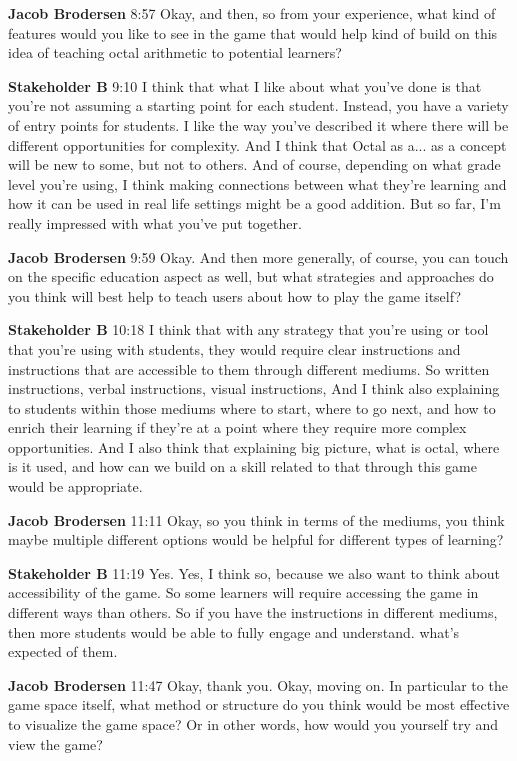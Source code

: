\documentclass{article}
\begin{document}
\noindent \textbf{Jacob Brodersen}   8:57
Okay, and then, so from your experience, what kind of features would you like to see in the game that would help kind of build on this idea of teaching octal arithmetic to potential learners?

\noindent \textbf{Stakeholder B}   9:10
I think that what I like about what you've done is that you're not assuming a starting point for each student. Instead, you have a variety of entry points for students. I like the way you've described it where there will be different opportunities for complexity.
And I think that Octal as a...
as a concept will be new to some, but not to others. And of course, depending on what grade level you're using, I think making connections between what they're learning and how it can be used in real life settings might be a good addition. But so far, I'm really impressed with what you've put together.

\noindent \textbf{Jacob Brodersen}   9:59
Okay. And then more generally, of course, you can touch on the specific education aspect as well, but what strategies and approaches do you think will best help to teach users about how to play the game itself?

\noindent \textbf{Stakeholder B}   10:18
I think that with any strategy that you're using or tool that you're using with students, they would require clear instructions and instructions that are accessible to them through different mediums. So written instructions, verbal instructions, visual instructions,
And I think also explaining to students within those mediums where to start, where to go next, and how to enrich their learning if they're at a point where they require more complex opportunities. And I also think that
explaining big picture, what is octal, where is it used, and how can we build on a skill related to that through this game would be appropriate.

\noindent \textbf{Jacob Brodersen}   11:11
Okay, so you think in terms of the mediums, you think maybe multiple different options would be helpful for different types of learning?

\noindent \textbf{Stakeholder B}   11:19
Yes.
Yes, I think so, because we also want to think about accessibility of the game. So some learners will require accessing the game in different ways than others. So if you have the instructions in different mediums, then more students would be able to fully engage and understand.
what's expected of them.

\noindent \textbf{Jacob Brodersen}   11:47
Okay, thank you.
Okay, moving on.
In particular to the game space itself, what method or structure do you think would be most effective to visualize the game space? Or in other words, how would you yourself try and view the game?
\end{document}
